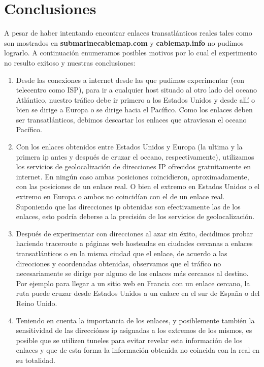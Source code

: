 \section{Conclusiones}


A pesar de haber intentando encontrar enlaces transatlánticos reales tales como son mostrados en \textbf{submarinecablemap.com} y \textbf{cablemap.info} no pudimos lograrlo. A continuación enumeramos posibles motivos por lo cual el experimento no resulto exitoso y nuestras conclusiones:
\begin{enumerate}
\item	Desde las conexiones a internet desde las que pudimos experimentar (con telecentro como ISP), para ir a cualquier host situado al otro lado del oceano Atlántico, nuestro tráfico debe ir primero a los Estados Unidos y desde allí o bien se dirige a Europa o se dirige hacia el Pacífico. Como los enlaces deben ser transatlánticos, debimos descartar los enlaces que atraviesan el oceano Pacífico.
\item	Con los enlaces obtenidos entre Estados Unidos y Europa (la ultima y la primera ip antes y después de cruzar el oceano, respectivamente), utilizamos los servicios de geolocalización de direcciones IP ofrecidos gratuitamente en internet. En ningún caso ambas posiciones coincidieron, aproximadamente, con las posiciones de un enlace real. O bien el extremo en Estados Unidos o el extremo en Europa o ambos no coincidían con el de un enlace real. Suponiendo que las direcciones ip obtenidas son efectivamente las de los enlaces, esto podría deberse a la precisión de los servicios de geolocalización.
\item	Después de experimentar con direcciones al azar sin éxito, decidimos probar haciendo traceroute a páginas web hosteadas en ciudades cercanas a enlaces transatlánticos o en la misma ciudad que el enlace, de acuerdo a las direcciones y coordenadas obtenidas, observamos que el tráfico no necesariamente se dirige por alguno de los enlaces más cercanos al destino. Por ejemplo para llegar a un sitio web en Francia con un enlace cercano, la ruta puede cruzar desde Estados Unidos a un enlace en el sur de España o del Reino Unido.
\item	Teniendo en cuenta la importancia de los enlaces, y posiblemente también la sensitividad de las direcciónes ip asignadas a los extremos de los mismos, es posible que se utilizen tuneles para evitar revelar esta información de los enlaces y que de esta forma la información obtenida no coincida con la real en su totalidad.
\end{enumerate}
